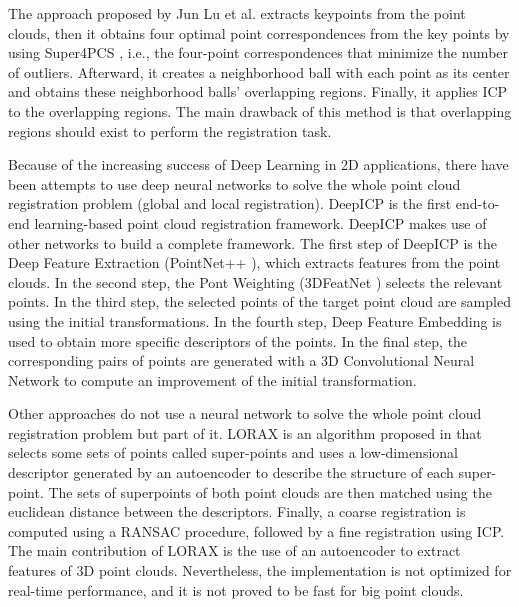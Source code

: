         The approach proposed by Jun Lu et al. \cite{Lu_2019_4pcsicp} extracts keypoints from the point clouds, 
        then it obtains four optimal point correspondences from the key points by using Super4PCS \cite{Mellado_2014_super4pcs},
        i.e., the four-point correspondences that minimize the number of outliers. 
        Afterward, it creates a neighborhood ball with each point as its center and obtains these neighborhood balls’ overlapping regions. 
        Finally, it applies ICP to the overlapping regions. 
        The main drawback of this method is that overlapping regions should exist to perform the registration task.

        Because of the increasing success of Deep Learning in 2D applications, there have been attempts to use deep neural networks
        to solve the whole point cloud registration problem (global and local registration).
        DeepICP \cite{Lu_2019_deepicp} is the first end-to-end learning-based point cloud registration framework.
        DeepICP makes use of other networks to build a complete framework.
        The first step of DeepICP is the Deep Feature Extraction (PointNet++ \cite{Qi_2017_pointnet}), which extracts features from the point clouds.
        In the second step, the Pont Weighting (3DFeatNet \cite{Yew_2018_3dfeat}) selects the relevant points.
        In the third step, the selected points of the target point cloud are sampled using the initial transformations.
        In the fourth step, Deep Feature Embedding is used to obtain more specific descriptors of the points.
        In the final step, the corresponding pairs of points are generated with a 3D Convolutional Neural Network
        to compute an improvement of the initial transformation.
        
        Other approaches do not use a neural network to solve the whole point cloud registration problem but part of it.
        LORAX is an algorithm proposed in \cite{Elbaz_2017_3dpoint} that selects some sets of points called super-points and uses a low-dimensional descriptor 
        generated by an autoencoder to describe the structure of each super-point.
        The sets of superpoints of both point clouds are then matched using the euclidean distance between the descriptors.
        Finally, a coarse registration is computed using a RANSAC procedure, followed by a fine registration using ICP.
        The main contribution of LORAX is the use of an autoencoder to extract features of 3D point clouds. 
        Nevertheless, the implementation is not optimized for real-time performance, and it is not proved to be fast for big point clouds.

